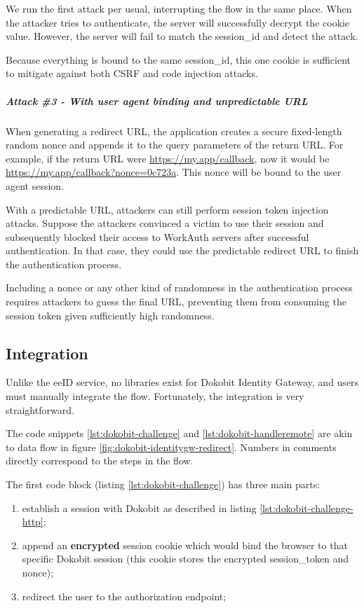 We run the first attack per usual, interrupting the flow in the same place. When the attacker tries to authenticate, the server will successfully decrypt the cookie value. However, the server will fail to match the session\_id and detect the attack.

Because everything is bound to the same session\_id, this one cookie is sufficient to mitigate against both CSRF and code injection attacks.

\subparagraph{Attack \#3 - With user agent binding and unpredictable URL}

When generating a redirect URL, the application creates a secure fixed-length random nonce and appends it to the query parameters of the return URL. For example, if the return URL were \url{https://my.app/callback}, now it would be \url{https://my.app/callback?nonce=0c723a}. This nonce will be bound to the user agent session.

With a predictable URL, attackers can still perform session token injection attacks. Suppose the attackers convinced a victim to use their session and subsequently blocked their access to WorkAuth servers after successful authentication. In that case, they could use the predictable redirect URL to finish the authentication process.

Including a nonce or any other kind of randomness in the authentication process requires attackers to guess the final URL, preventing them from consuming the session token given sufficiently high randomness.

\subsection{Integration}

Unlike the eeID service, no libraries exist for Dokobit Identity Gateway, and users must manually integrate the flow. Fortunately, the integration is very straightforward.

The code snippets \ref{lst:dokobit-challenge} and \ref{lst:dokobit-handleremote} are akin to data flow in figure \ref{fig:dokobit-identitygw-redirect}. Numbers in comments directly correspond to the steps in the flow.

The first code block (listing \ref{lst:dokobit-challenge}) has three main parts:

\begin{enumerate}
  \item establish a session with Dokobit as described in listing \ref{lst:dokobit-challenge-http};
  \item append an \textbf{encrypted} session cookie which would bind the browser to that specific Dokobit session (this cookie stores the encrypted session\_token and nonce);
  \item redirect the user to the authorization endpoint;
\end{enumerate}

